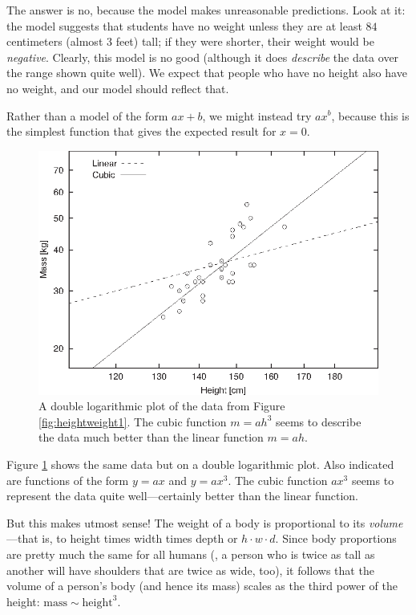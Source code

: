The answer is no, because the model makes unreasonable predictions.
Look at it: the model suggests that students have no weight unless
they are at least $84$ centimeters (almost 3 feet) tall; if they were
shorter, their weight would be \emph{negative}. Clearly, this model is
no good (although it does \emph{describe} the data over the range
shown quite well). We expect that people  who have no height also have
no weight, and our model should reflect that.

Rather than a model of the form $a x + b$, we might instead try $a
x^b$, because this is the simplest function that gives the expected
result for $x=0$.

\begin{figure}
\centerline{\includegraphics{img/heightweight2}}
  \caption{A double logarithmic plot of the data from Figure
    \ref{fig:heightweight1}.  The cubic function ${m} = {ah}^3$ seems to
    describe the data much better than the linear function ${m} = {ah}$.}
  \label{fig:heightweight2}
\end{figure}\pagebreak

Figure \ref{fig:heightweight2} shows the same data but on a double
logarithmic plot. Also indicated are functions of the form $y=a x$ and
$y=ax^3$. The cubic function $a x^3$ seems to represent the data quite
well---certainly better than the linear function.

But this makes utmost sense! The weight of a body is proportional to
its \emph{volume}---that is, to height times width times depth or $h
\cdot w \cdot d$.  Since body proportions are pretty much the same for
all humans (\ie, a person who is twice as tall as another will have
shoulders that are twice as wide, too), it follows that the volume of a
person's body (and hence its mass) scales as the third power of the
height: $\text{mass} \sim \text{height}^3$.


